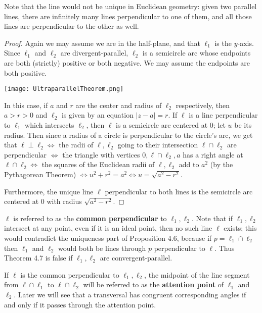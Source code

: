 \documentclass[leqno]{book}
\begin{document}
\noindent Note that the line would not be unique in Euclidean geometry: given two parallel lines, there are infinitely many lines perpendicular to one of them, and all those lines are perpendicular to the other as well.
\begin{proof}
Again we may assume we are in the half-plane, and that $\ell_1$ is the $y$-axis.  Since $\ell_1$ and $\ell_2$ are divergent-parallel, $\ell_2$ is a semicircle arc whose endpoints are both (strictly) positive or both negative.  We may assume the endpoints are both positive.
\begin{center}\texttt{[image: UltraparallelTheorem.png]}\end{center}
In this case, if $a$ and $r$ are the center and radius of $\ell_2$ respectively, then $a>r>0$ and $\ell_2$ is given by an equation $|z-a|=r$.  If $\ell$ is a line perpendicular to $\ell_1$ which intersects $\ell_2$, then $\ell$ is a semicircle arc centered at $0$; let $u$ be its radius.  Then since a radius of a circle is perpendicular to the circle's arc, we get that $\ell\perp\ell_2\iff$ the radii of $\ell,\ell_2$ going to their intersection $\ell\cap\ell_2$ are perpendicular $\iff$ the triangle with vertices $0,\ell\cap\ell_2,a$ has a right angle at $\ell\cap\ell_2\iff$ the squares of the Euclidean radii of $\ell,\ell_2$ add to $a^2$ (by the Pythagorean Theorem) $\iff u^2+r^2=a^2\iff u=\sqrt{a^2-r^2}$.

Furthermore, the unique line $\ell$ perpendicular to both lines is the semicircle arc centered at $0$ with radius $\sqrt{a^2-r^2}$.
\end{proof}

\noindent $\ell$ is referred to as the \textbf{common perpendicular} to $\ell_1,\ell_2$.  Note that if $\ell_1,\ell_2$ intersect at any point, even if it is an ideal point, then no such line $\ell$ exists; this would contradict the uniqueness part of Proposition 4.6, because if $p=\ell_1\cap\ell_2$ then $\ell_1$ and $\ell_2$ would both be lines through $p$ perpendicular to $\ell$.  Thus Theorem 4.7 is false if $\ell_1,\ell_2$ are convergent-parallel.

If $\ell$ is the common perpendicular to $\ell_1,\ell_2$, the midpoint of the line segment from $\ell\cap\ell_1$ to $\ell\cap\ell_2$ will be referred to as the \textbf{attention point} of $\ell_1$ and $\ell_2$.  Later we will see that a transversal has congruent corresponding angles if and only if it passes through the attention point.\\%
\end{document}
